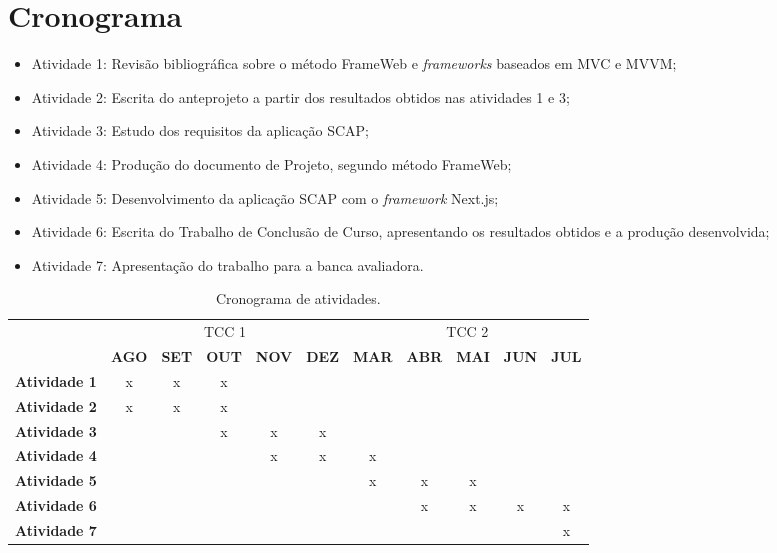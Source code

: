 \section{Cronograma}
\label{sec-intro-crono}

\begin{itemize}
\item Atividade 1: Revisão bibliográfica sobre o método FrameWeb e \textit{frameworks} baseados em MVC e MVVM;
\item Atividade 2: Escrita do anteprojeto a partir dos resultados obtidos nas atividades 1 e 3;
\item Atividade 3: Estudo dos requisitos da aplicação SCAP;
\item Atividade 4: Produção do documento de Projeto, segundo método FrameWeb;
\item Atividade 5: Desenvolvimento da aplicação SCAP com o \textit{framework} Next.js;
\item Atividade 6: Escrita do Trabalho de Conclusão de Curso, apresentando os resultados obtidos e a produção desenvolvida;
\item Atividade 7: Apresentação do trabalho para a banca avaliadora.
\end{itemize}

\begin{table}[h]
    \centering
    \small %
    \setlength{\tabcolsep}{4pt} %
    \begin{tabular}{c|*{10}{c|}}
        \cline{2-11}
        \multicolumn{1}{l|}{} & \multicolumn{5}{c|}{TCC 1} & \multicolumn{5}{c|}{TCC 2} \\
        \cline{2-11}
        \multicolumn{1}{l|}{} & \textbf{AGO} & \textbf{SET} & \textbf{OUT} & \textbf{NOV} & \textbf{DEZ} & \textbf{MAR} & \textbf{ABR} & \textbf{MAI} & \textbf{JUN} & \textbf{JUL} \\ \hline
        \multicolumn{1}{|c|}{\textbf{Atividade 1}} & x & x & x &   &   &   &   &   &   &   \\ \hline
        \multicolumn{1}{|c|}{\textbf{Atividade 2}} & x & x & x &   &   &   &   &   &   &   \\ \hline
        \multicolumn{1}{|c|}{\textbf{Atividade 3}} &   &   & x & x & x &   &   &   &   &   \\ \hline
        \multicolumn{1}{|c|}{\textbf{Atividade 4}} &   &   &   & x & x & x &   &   &   &   \\ \hline
        \multicolumn{1}{|c|}{\textbf{Atividade 5}} &   &   &   &   &   & x & x & x &   &   \\ \hline
        \multicolumn{1}{|c|}{\textbf{Atividade 6}} &   &   &   &   &   &   & x & x & x & x \\ \hline
        \multicolumn{1}{|c|}{\textbf{Atividade 7}} &   &   &   &   &   &   &   &   &   & x \\ \hline
    \end{tabular}
    \caption{Cronograma de atividades.}
\end{table}


